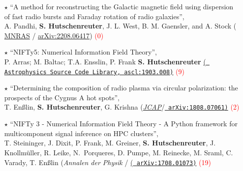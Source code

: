 \begin{itemize}
      \begin{itemize}
        \item[\textcolor{Black}{$\star$}]{``A method for reconstructing the Galactic magnetic field using dispersion of fast radio bursts and Faraday rotation of radio galaxies'', \\
        A. Pandhi, \textbf{S. Hutschenreuter}, J. L. West, B. M. Gaensler, and A. Stock ({\color{blue} \href{https://doi.org/10.1093/mnras/stac2314}{MNRAS} / \href{https://arxiv.org/abs/2208.06417}{arXiv:2208.06417}})
        \textcolor{red}{(0)}
        }

        \vspace{6pt}

        \item[\textcolor{Black}{$\star$}]{``NIFTy5: Numerical Information Field Theory'', \\P. Arras; M. Baltac; T.A. Ensslin, P. Frank \textbf{S. Hutschenreuter} \href{http://ascl.net/1903.008}{(\texttt{{\color{blue} Astrophysics Source Code Library, ascl:1903.008})}}
        \textcolor{red}{(9)}
        }

        \vspace{6pt}

        \item[\textcolor{Black}{$\star$}]{``Determining the composition of radio plasma via circular polarization: the prospects of the Cygnus A hot spots'', \\
        T. En{\ss}lin, \textbf{S. Hutschenreuter}, G. Krishna ({\color{blue}\href{https://iopscience.iop.org/article/10.1088/1475-7516/2019/01/035/meta}{\textit{JCAP}}/\href{https://arxiv.org/abs/1808.07061}{\texttt{{\color{blue} arXiv:1808.07061})}}}
        \textcolor{red}{(2)}
        }

        \vspace{6pt}

        \item[\textcolor{Black}{$\star$}]{``NIFTy 3 - Numerical Information Field Theory - A Python framework for multicomponent signal inference on HPC clusters'', \\
        T. Steininger, J. Dixit, P. Frank, M. Greiner, \textbf{S. Hutschenreuter}, J. Knollm{\"u}ller, R. Leike, N.~Porqueres, D. Pumpe, M. Reinecke, M. Sraml, C. Varady, T. En{\ss}lin ({\color{blue}\textit{Annalen der Physik}} / \href{https://arxiv.org/abs/1708.01073}{(\texttt{{\color{blue} arXiv:1708.01073})}}
        \textcolor{red}{(19)}
        }

        \vspace{6pt}


\end{itemize}
\end{itemize}

